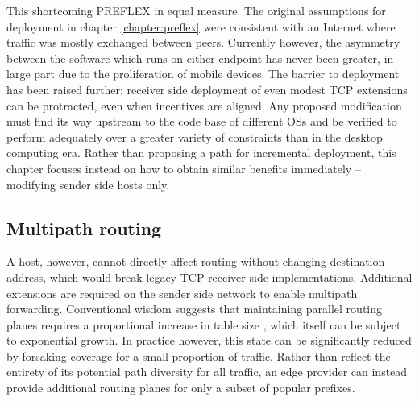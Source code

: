 This shortcoming \ac{PREFLEX} in equal measure.
The original assumptions for deployment in chapter \ref{chapter:preflex} were consistent with an Internet where traffic was mostly exchanged between peers.
Currently however, the asymmetry between the software which runs on either endpoint has never been greater, in large part due to the proliferation of mobile devices.
The barrier to deployment has been raised further: receiver side deployment of even modest \ac{TCP} extensions can be protracted, even when incentives are aligned.
Any proposed modification must find its way upstream to the code base of different \acp{OS} and be verified to perform adequately over a greater variety of constraints than in the desktop computing era.
Rather than proposing a path for incremental deployment, this chapter focuses instead on how to obtain similar benefits immediately -- modifying sender side hosts only. 

\subsection{Multipath routing}

A host, however, cannot directly affect routing without changing destination address, which would break legacy \ac{TCP} receiver side implementations. Additional extensions are required on the sender side network to enable multipath forwarding.
Conventional wisdom suggests that maintaining parallel routing planes requires a proportional increase in table size \cite{NingWang:2008p145}, which itself can be subject to exponential growth.
In practice however, this state can be significantly reduced by forsaking coverage for a small proportion of traffic.
Rather than reflect the entirety of its potential path diversity for all traffic, an edge provider can instead provide additional routing planes for only a subset of popular prefixes.

